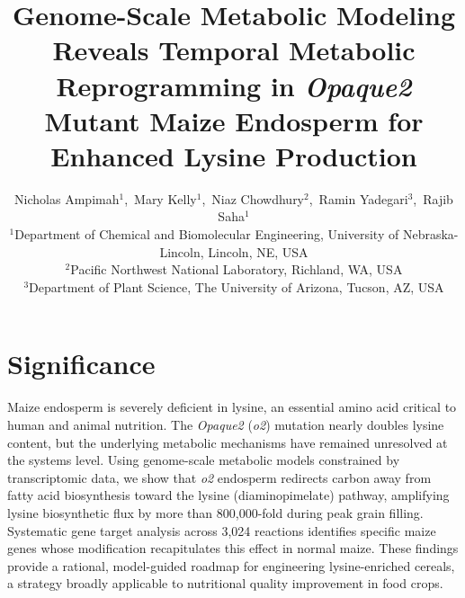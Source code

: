 \documentclass[12pt,a4paper]{article}
\title{\textbf{Genome-Scale Metabolic Modeling Reveals Temporal Metabolic Reprogramming in \textit{Opaque2} Mutant Maize Endosperm for Enhanced Lysine Production}}
\author{
Nicholas Ampimah$^{1}$,\ Mary Kelly$^{1}$,\ Niaz Chowdhury$^{2}$,\ Ramin Yadegari$^{3}$,\ Rajib Saha$^{1}$ \\[8pt]
\small
$^{1}$Department of Chemical and Biomolecular Engineering, University of Nebraska-Lincoln, Lincoln, NE, USA \\
$^{2}$Pacific Northwest National Laboratory, Richland, WA, USA \\
$^{3}$Department of Plant Science, The University of Arizona, Tucson, AZ, USA \\
}
\date{}
\begin{document}
\maketitle

\section*{Significance}

Maize endosperm is severely deficient in lysine, an essential amino acid critical to human and animal nutrition. The \textit{Opaque2} (\textit{o2}) mutation nearly doubles lysine content, but the underlying metabolic mechanisms have remained unresolved at the systems level. Using genome-scale metabolic models constrained by transcriptomic data, we show that \textit{o2} endosperm redirects carbon away from fatty acid biosynthesis toward the lysine (diaminopimelate) pathway, amplifying lysine biosynthetic flux by more than 800,000-fold during peak grain filling. Systematic gene target analysis across 3,024 reactions identifies specific maize genes whose modification recapitulates this effect in normal maize. These findings provide a rational, model-guided roadmap for engineering lysine-enriched cereals, a strategy broadly applicable to nutritional quality improvement in food crops.
\end{document}

